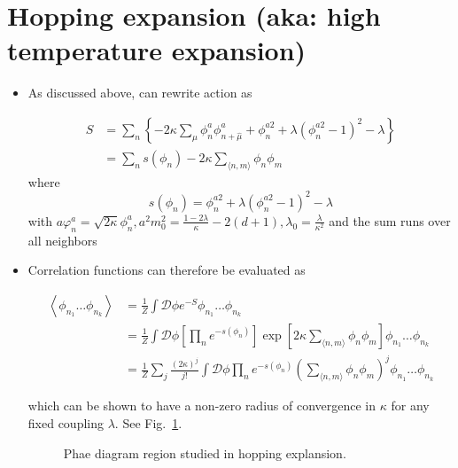 \section{Hopping expansion (aka: high temperature expansion)} 
\begin{itemize}
 \item As discussed above, can rewrite action as

\begin{align}
S&=\sum_{n}\left\{-2 \kappa \sum_{\mu} \phi_{n}^{a} \phi_{n+\hat{\mu}}^{a}+\phi_{n}^{a 2}+\lambda\left(\phi_{n}^{a 2}-1\right)^{2}-\lambda\right\}\\
&= \sum_n s(\phi_n) - 2 \kappa \sum_{\langle n, m\rangle}\phi_n \phi_m
\end{align}
where
\begin{equation}
    s(\phi_n)=\phi_n^{a 2}+\lambda(\phi_n^{a2}-1)^2 -\lambda
\end{equation}
with \(a \varphi_{n}^{a}=\sqrt{2 \kappa} \phi_{n}^{a}, a^{2} m_{0}^{2}=\frac{1-2 \lambda}{\kappa}-2(d+1), \lambda_{0}=\frac{\lambda}{\kappa^{2}}\) and the sum runs over all neighbors

\item Correlation functions can therefore be evaluated as

\begin{equation}
\begin{aligned}
\left\langle\phi_{n_{1}}\ldots \phi_{n_k}\right\rangle & =\frac{1}{Z} \int \mathcal{D} \phi e^{-S} \phi_{n_{1}}\ldots \phi_{n_k} \\
& =\frac{1}{Z} \int \mathcal{D} \phi\left[\prod_{n} e^{-s\left(\phi_{n}\right)}\right] \exp\left[2 \kappa \sum_{\langle n, m\rangle} \phi_{n} \phi_{m}\right] \phi_{n_1} \ldots \phi_{n_k} \\
& =\frac{1}{Z} \sum_{j}\frac{(2 \kappa)^{j}}{j!} \int \mathcal{D} \phi \prod_{n} e^{-s\left(\phi_{n}\right)}\left(\sum_{\langle n, m\rangle} \phi_{n} \phi_{m}\right)^{j} \phi_{n_1}\ldots \phi_{n_k}
\end{aligned}
\end{equation}

which can be shown to have a non-zero radius of convergence in $\kappa$ for any fixed coupling $\lambda$.
See Fig.~\ref{fig:kappa_exp}.
\begin{figure}
    \centering
    \caption{Phae diagram region studied in hopping explansion. 
    \label{fig:kappa_exp}}
\end{figure}


\end{itemize}
